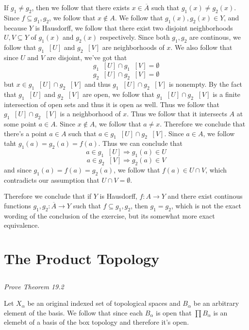 \documentclass[11pt,oneside,titlepage]{book}
\DeclareMathOperator \inv {^{-1}}
\DeclareMathOperator \ra {\Rightarrow}
\begin{document}
If $g_1 \neq g_2$, then we follow that there exists $x \in \overline{A}$ such that
$g_1(x) \neq g_2(x)$. Since $f \subseteq g_1, g_2$, we follow that $x \notin A$. 
We follow that $g_1(x), g_2(x) \in Y$, and because
$Y$ is Hausdorff, we follow that there exist two disjoint neighborhoods $U, V \subseteq Y$
of $g_1(x)$ and $g_2(x)$ respectively. Since both $g_1, g_2$ are continous, we follow that
$g_1\inv[U]$ and $g_2\inv[V]$ are neighborhoods of $x$. We also follow that
since $U$ and $V$ are disjoint, we've got that
$$g_1\inv[U] \cap g_1\inv[V] = \emptyset$$
$$g_2\inv[U] \cap g_2\inv[V] = \emptyset$$
but $x \in g_1\inv[U] \cap g_2 \inv[V]$ and thus $g_1\inv[U] \cap g_2 \inv[V]$
is nonempty. By the fact that $g_1\inv[U]$ and $g_2\inv[V]$ are open, we follow that
$g_1\inv[U] \cap g_2\inv[V]$ is a finite intersection of open sets and thus it is
open as well. Thus we follow that $g_1\inv[U] \cap g_2\inv[V]$ is a neighborhood of $x$.
Thus we follow that it intersects $A$ at some point $a \in A$.
Since $x \notin A$, we follow that $a \neq x$.
Therefore we conclude that there's a point $a \in A$ such that $a \in g_1\inv[U] \cap g_2\inv[V]$.
Since $a \in A$, we follow taht $g_1(a) = g_2(a) = f(a)$. Thus we can conclude that
$$a \in g_1\inv[U] \ra g_1(a) \in U$$
$$a \in g_2\inv[V] \ra g_2(a) \in V$$
and since $g_1(a) = f(a) = g_2(a)$, we follow that $f(a) \in U \cap V$, which contradicts
our assumption that $U \cap V = \emptyset$.

Therefore we conclude that if $Y$ is Hausdorff, $f: A \to Y$ and there exist
continous functions
$g_1, g_2: \overline{A} \to Y$ such that $f \subseteq g_1, g_2$, then $g_1 = g_2$,
which is not the exact wording of the conclusion of the exercise, but its somewhat more
exact equivalence.

\section{The Product Topology}

\subsection{}

\textit{Prove Theorem 19.2}

Let $X_\alpha$ be an original indexed set of topological spaces and $B_\alpha$ be an arbitrary
element of the basis. We follow that since each $B_\alpha$ is open that
$\prod B_\alpha$ is an elemebt of a basis of the box topology and therefore it's open.
\end{document}
